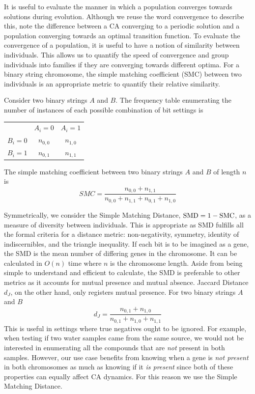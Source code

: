 It is useful to evaluate the manner in which a population converges towards solutions during evolution. Although we reuse the word convergence to describe this, note the difference between a CA converging to a periodic solution and a population converging towards an optimal transition function. To evaluate the convergence of a population, it is useful to have a notion of similarity between individuals. This allows us to quantify the speed of convergence and group individuals into families if they are converging towards different optima. For a binary string chromosome, the simple matching coefficient (SMC) between two individuals is an appropriate metric to quantify their relative similarity. 
\begin{definition} Consider two binary strings $A$ and $B$. The frequency table enumerating the number of instances of each possible combination of bit settings is
\begin{center}
    \begin{tabular}{ c c c }
              & $A_i = 0$ & $A_i = 1$ \\ 
        $B_i = 0$ & $n_{0,0}$ & $n_{1,0}$ \\  
        $B_i = 1$ & $n_{0,1}$ & $n_{1, 1}$    
    \end{tabular}
\end{center}
The simple matching coefficient between two binary strings $A$ and $B$ of length $n$ is\\
\[
    SMC = \frac{n_{0, 0} + n_{1, 1}}{n_{0, 0} + n_{1, 1} + n_{0, 1} + n_{1, 0}}
\]
    
\end{definition}
Symmetrically, we consider the Simple Matching Distance, $\textnormal{SMD} = 1 - \textnormal{SMC}$, as a measure of diversity between individuals. This is appropriate as SMD fulfills all the formal criteria for a distance metric: non-negativity, symmetry, identity of indiscernibles, and the triangle inequality. If each bit is to be imagined as a gene, the SMD is the mean number of differing genes in the chromosome. It can be calculated in $O(n)$ time where $n$ is the chromosome length. Aside from being simple to understand and efficient to calculate, the SMD is preferable to other metrics as it accounts for mutual presence and mutual absence. Jaccard Distance $d_J$, on the other hand, only registers mutual presence. For two binary strings $A$ and $B$
\[
    d_J = \frac{n_{0, 1} + n_{1, 0}}{n_{0, 1} + n_{1, 0} + n_{1, 1}}
\]
This is useful in settings where true negatives ought to be ignored. For example, when testing if two water samples came from the same source, we would not be interested in enumerating all the compounds that are \textit{not} present in both samples. However, our use case benefits from knowing when a gene is \textit{not present} in both chromosomes as much as knowing if it \textit{is present} since both of these properties can equally affect CA dynamics. For this reason we use the Simple Matching Distance.

